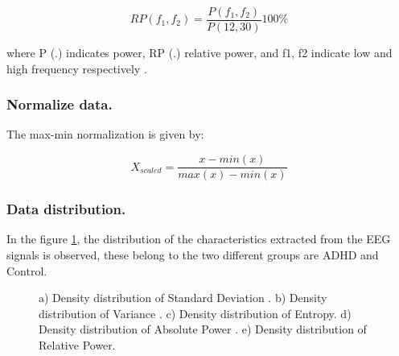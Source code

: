 \documentclass[letterpaper,12pt,openright,oneside]{article}
\begin{document}
\begin{equation}
RP(f_1,f_2) = \frac{P(f_1,f_2)}{P(12,30)} 100\%
\end{equation}

where P (.) indicates power, RP (.) relative power, and f1, f2 indicate low and high frequency respectively \cite{bzl}.

\subsubsection{Normalize data.}
The max-min normalization is given  by:

\begin{equation}
X_{scaled} = \frac{x - min(x)}{max(x)-min(x)}
\end{equation}


\subsubsection{Data distribution.}
In the figure \ref{fig 240}, the distribution of the characteristics extracted from the EEG signals is observed, these belong to the two different groups are ADHD and Control.


\begin{figure}[H]
\centerline{}
\caption{a) Density distribution of Standard Deviation . b) Density distribution of Variance . c) Density distribution of Entropy. d) Density distribution of Absolute Power  . e) Density distribution of Relative Power.}
\label{fig 240}
\end{figure}


\end{document}
